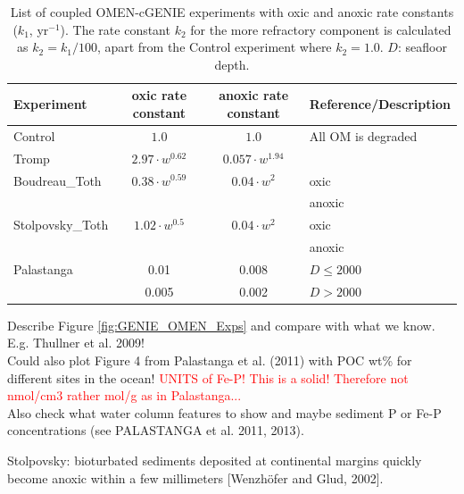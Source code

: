 \documentclass[gmd, manuscript]{copernicus}
\begin{document}
\begin{table}[btp]
\caption{List of  coupled OMEN-cGENIE experiments with oxic and anoxic rate constants ($k_1$, yr$^{-1}$). The rate constant $k_2$ for the more refractory component is 
calculated as $k_2 = k_1/100$, apart from the Control experiment where $k_2 = 1.0$. $D$: seafloor depth.}
\centering
\begin{tabular}{l c c l}
\hline\hline
Experiment & oxic rate constant  &  anoxic rate constant  & Reference/Description\\
\hline
Control & $1.0$ & $1.0$ & All OM is degraded\\
Tromp & $2.97\cdot w^{0.62}$ & $0.057\cdot w^{1.94}$ & \citet{tromp_global_1995} \\
Boudreau\_Toth & $0.38\cdot w^{0.59}$ & $0.04\cdot w^{2}$ & \citet{boudreau1997diagenetic} oxic\\
& & & \citet{toth_organic_1977} anoxic\\
Stolpovsky\_Toth & $1.02\cdot w^{0.5}$ & $0.04\cdot w^{2}$ & \citet{stolpovsky_toward_2015} oxic\\
& & & \citet{toth_organic_1977} anoxic\\
Palastanga & 0.01 & 0.008 & $D\leq 2000$\\
 & 0.005 & 0.002 & $D > 2000$ \citet{palastanga_long_term_2011} \\
\hline\hline
\end{tabular}
\label{table:OM_degrad_para}
\end{table}

Describe Figure \ref{fig:GENIE_OMEN_Exps} and compare with what we know. E.g. Thullner et al. 2009! \\

Could also plot Figure 4 from Palastanga et al. (2011) with POC wt\% for different sites in the ocean!
\textcolor{red}{UNITS of Fe-P! This is a solid! Therefore not nmol/cm3 rather mol/g as in Palastanga... }\\

Also check what water column features to show and maybe sediment P or Fe-P concentrations (see PALASTANGA et al. 2011, 2013).

Stolpovsky: bioturbated sediments deposited at continental margins quickly become anoxic within a few millimeters [Wenzhöfer and Glud, 2002].

\end{document}
